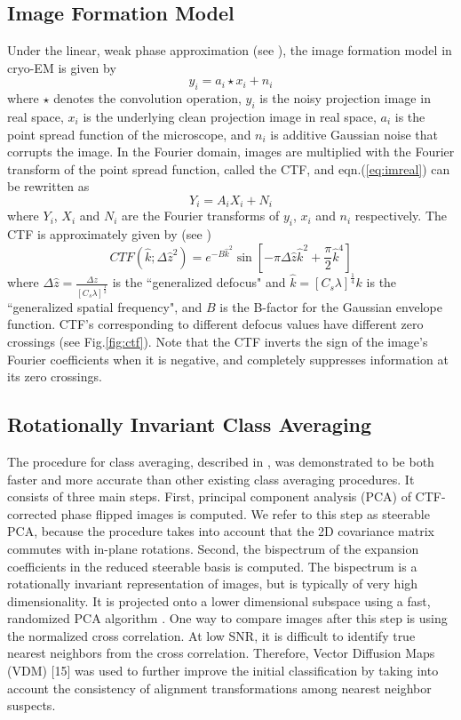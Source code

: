 \subsection{Image Formation Model}
Under the linear, weak phase approximation (see \cite[Chapter~2]{Frank1}), the image formation model in cryo-EM is given by
\begin{equation}
y_i = a_i\star x_i + n_i
\label{eq:imreal}
\end{equation}
where $\star$ denotes the convolution operation, $y_i$ is the noisy projection image in real space, $x_i$ is the underlying clean projection image in real space, $a_i$ is the point spread function of the microscope, and $n_i$ is additive Gaussian noise that corrupts the image. In the Fourier domain, images are multiplied with the Fourier transform of the point spread function, called the CTF, and eqn.(\ref{eq:imreal}) can be rewritten as
\begin{equation}
Y_i = A_iX_i + N_i
\label{eq:imfour}
\end{equation}
where $Y_i$, $X_i$ and $N_i$ are the Fourier transforms of $y_i$, $x_i$ and $n_i$ respectively.
The CTF is approximately  given by (see \cite[Chapter~3]{Frank1})
\begin{equation}
CTF(\hat{k};\Delta\hat{z}^2)= e^{-{B\hat{k}}^2}\sin[-\pi \Delta\hat{z}\hat{k}^2 + \frac{\pi}{2} \hat{k}^4]
\label{eq:ctf}
\end{equation}
where 
$\Delta\hat{z}=\frac{\Delta z}{[C_s \lambda]^{\frac{1}{2}}}$ is the ``generalized defocus" and $\hat{k}=[C_s \lambda]^{\frac{1}{4}}k$ is the ``generalized spatial frequency", and $B$ is the B-factor for the Gaussian envelope function. CTF's corresponding to different defocus values have different zero crossings (see Fig.\ref{fig:ctf}). Note that the CTF inverts the sign of the image's Fourier coefficients when it is negative, and completely suppresses information at its zero crossings.

\subsection{Rotationally Invariant Class Averaging}
The procedure for class averaging, described in \cite{zhao}, was demonstrated to be both faster and more accurate than other existing class averaging procedures. It consists of three main steps. First, principal component analysis (PCA) of CTF-corrected phase flipped images is computed. We refer to this step as steerable PCA, because the procedure takes into account that the 2D covariance matrix commutes with in-plane rotations. Second, the bispectrum of the expansion coefficients in the reduced steerable basis is computed. The bispectrum is a rotationally invariant representation of images, but is typically of very high dimensionality. It is projected onto a lower dimensional subspace using a fast, randomized PCA algorithm \cite{rokhlin}. One way to compare images after this step is using the normalized cross correlation. At low SNR, it is difficult to identify true nearest neighbors from the cross correlation. Therefore, Vector Diffusion Maps (VDM) [15] was used to further improve the initial classification by taking into account the consistency of alignment transformations among nearest neighbor suspects. 


